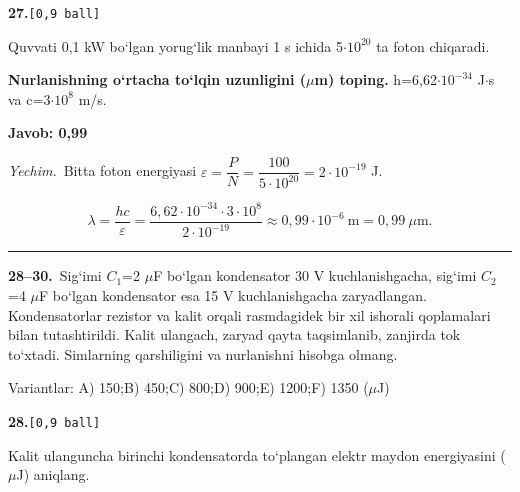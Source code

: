 \documentclass[11pt,a4paper]{article}
\newcommand{\ball}[1]{\hfill\texttt{[#1 ball]}}
\newcommand{\qhead}[2]{\Needspace{10\baselineskip}\noindent\textbf{#1.}\ball{#2}\par\nopagebreak}
\newenvironment{qbody}{\begin{list}{}{\leftmargin=8mm\rightmargin=0pt\topsep=0pt\itemsep=0pt\parsep=3pt}\item\relax}{\end{list}}
\begin{document}
\qhead{27}{0,9}
\begin{qbody}
Quvvati 0,1 kW bo‘lgan yorug‘lik manbayi 1 s ichida 5$\cdot10^{20}$ ta foton chiqaradi.\par
\textbf{Nurlanishning o‘rtacha to‘lqin uzunligini ($\mu$m) toping.} h=6,62$\cdot10^{-34}$ J$\cdot$s va c=3$\cdot10^{8}$ m/s.\par
\end{qbody}
\noindent\colorbox{gray!12}{\parbox{\dimexpr\linewidth-2\fboxsep}{\textbf{Javob: 0,99}}}\par\smallskip
\noindent\textit{Yechim.}\ Bitta foton energiyasi $\varepsilon=\dfrac{P}{N}=\dfrac{100}{5\cdot10^{20}}=2\cdot10^{-19}$ J.\par
\[\lambda=\frac{hc}{\varepsilon}=\frac{6{,}62\cdot10^{-34}\cdot3\cdot10^8}{2\cdot10^{-19}}\approx0{,}99\cdot10^{-6}\ \text{m}=0{,}99\ \mu\text{m}.\]\par\medskip\hrule\medskip
{}\noindent\textbf{28--30.}\ Sig‘imi $C_1$=2 $\mu$F bo‘lgan kondensator 30 V kuchlanishgacha, sig‘imi $C_2$=4 $\mu$F bo‘lgan kondensator esa 15 V kuchlanishgacha zaryadlangan. Kondensatorlar rezistor va kalit orqali rasmdagidek bir xil ishorali qoplamalari bilan tutashtirildi. Kalit ulangach, zaryad qayta taqsimlanib, zanjirda tok to‘xtadi. Simlarning qarshiligini va nurlanishni hisobga olmang.\par
\begin{center}\end{center}
\noindent Variantlar: A) 150;\quad B) 450;\quad C) 800;\quad D) 900;\quad E) 1200;\quad F) 1350 ($\mu$J)\par\medskip
\noindent\textbf{28.}\ball{0,9}\par\nopagebreak\noindent Kalit ulanguncha birinchi kondensatorda to‘plangan elektr maydon energiyasini ($\mu$J) aniqlang.\par
\end{document}
